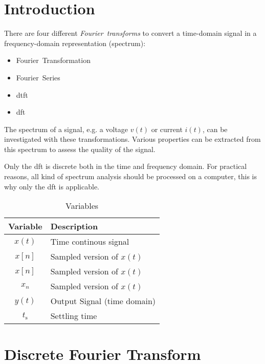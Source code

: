 \documentclass{article}[11pt]
\begin{document}
\notetitle

\section{Introduction}
There are four different \textit{Fourier~transforms} to convert a time-domain 
signal in a frequency-domain representation (spectrum):
\begin{itemize}
  \item Fourier~Transformation
  \item Fourier~Series
  \item \gls{dtft}
  \item \gls{dft}
\end{itemize}
The spectrum of a signal, e.g. a voltage $v(t)$ or 
current $i(t)$, can be investigated with these transformations.
Various properties can be extracted from this spectrum to assess the quality
of the signal.

\medskip

Only the \gls{dft} is discrete both in the time and frequency domain.
For practical reasons, all kind of spectrum analysis should be processed on 
a computer, this is why only the \gls{dft} is applicable.

\begin{table}[H]
\centering
\caption{Variables}
\begin{tabular}{cl}
\toprule
\textbf{Variable}     & \textbf{Description}                     \\ \midrule
$x(t)$                & Time continous signal                    \\ 
$x[n]$                & Sampled version of  $x(t)$               \\ 
$x[n]$                & Sampled version of  $x(t)$               \\ 
$x_n$                 & Sampled version of  $x(t)$               \\ 
$y(t)$                & Output Signal (time domain)              \\ 
$t_{\mathrm{s}}$      & Settling time                            \\ \toprule
\end{tabular}
\label{tab:variables}
\end{table}

\section{Discrete Fourier Transform}
\end{document}
